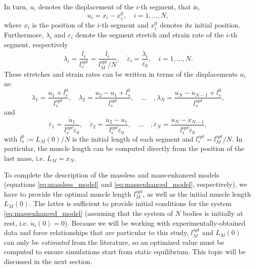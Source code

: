 \documentclass{sfuthesis}
\numberwithin{equation}{section}
\numberwithin{figure}{chapter}
\numberwithin{table}{chapter}
\theoremstyle{definition}
\newcommand{\depsilon}{\dot{\varepsilon}}
\begin{document}
In turn, $u_i$ denotes the displacement of the $i$-th segment, that is,
\begin{equation}
    u_i = x_i - x_i^0, \quad i=1,\dots,N,
\end{equation}
where $x_i$ is the position of the $i$-th segment and $x_i^0$ denotes its initial position. Furthermore, $\lambda_i$ and $\depsilon_i$ denote the segment stretch and strain rate of the $i$-th segment, respectively
\[
\lambda_i = \dfrac{l_i}{l_s^{opt}} = \dfrac{l_i}{l_M^{opt}/N}, \quad \depsilon_i = \dfrac{\dot{\lambda_i}}{\depsilon_0}, \quad i = 1,\dots,N.
\]
These stretches and strain rates can be written in terms of the displacements $u_i$ as:
\begin{equation}
    \lambda_1 = \dfrac{u_1 + l_s^0}{l_s^{opt}}, \quad \lambda_2 = \dfrac{u_2-u_1 + l_s^0}{l_s^{opt}}, \quad \dots \quad, \lambda_N = \dfrac{u_N-u_{N-1} + l_s^0}{l_s^{opt}},
\end{equation}
and
\begin{equation}
    \depsilon_1 = \dfrac{\dot{u}_1}{l_s^{opt} \depsilon_0}, \quad \depsilon_2 = \dfrac{\dot{u}_2-\dot{u}_1}{l_s^{opt} \depsilon_0}, \quad \dots \quad, \depsilon_N = \dfrac{\dot{u}_N - \dot{x}_{N-1}}{l_s^{opt} \depsilon_0},
\end{equation}
with $l_s^0 := L_M(0)/N$ is the initial length of each segment and $l_s^{opt} = l_M^{opt}/N$. In particular, the muscle length can be computed directly from the position of the last mass, i.e. $L_M = x_N$.

To complete the description of the massless and mass-enhanced models (equations \eqref{eq:massless_model} and \eqref{eq:massenhanced_model}, respectively), we have to provide the optimal muscle length $l_M^{opt}$, as well as the initial muscle length $L_M(0)$. The latter is sufficient to provide initial conditions for the system \eqref{eq:massenhanced_model} (assuming that the system of $N$ bodies is initially at rest, i.e. $\dot{u}_i(0) = 0$). Because we will be working with experimentally-obtained data and force relationships that are particular to this study, $l_M^{opt}$ and $L_M(0)$ can only be \textit{estimated} from the literature, so an optimized value must be computed to ensure simulations start from static equilibrium. This topic will be discussed in the next section.
\end{document}
